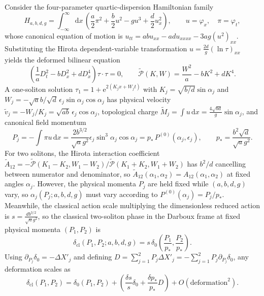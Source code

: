 \documentclass[11pt,a4paper]{article}
\newcommand{\dd}{\mathrm{d}}
\newcommand{\ee}{\mathrm{e}}
\begin{document}
Consider the four-parameter quartic-dispersion Hamiltonian family
\begin{equation}
H_{a,b,d,g} = \int_{-\infty}^\infty \dd x\,\left(\frac{a}{2}\pi^2 + \frac{b}{2}u^2 - g u^3 + \frac{d}{2}u_x^2\right), \qquad u = \varphi_x, \quad \pi = \varphi_t,
\end{equation}
whose canonical equation of motion is $u_{tt} = a b u_{xx} - a d u_{xxxx} - 3 a g (u^2)_{xx}$. Substituting the Hirota dependent-variable transformation $u = \frac{2d}{g}(\ln\tau)_{xx}$ yields the deformed bilinear equation
\begin{equation}
\left(\frac{1}{a}D_t^2 - b D_x^2 + d D_x^4\right)\tau\cdot\tau = 0, \qquad \tilde{\mathcal{P}}(K,W) = \frac{W^2}{a} - b K^2 + d K^4.
\end{equation}
A one-soliton solution $\tau_1 = 1 + \ee^{2(K_j x + W_j t)}$ with $K_j = \sqrt{b/d}\sin\alpha_j$ and $W_j = -\sqrt{a}b/\sqrt{d}\,\epsilon_j\sin\alpha_j\cos\alpha_j$ has physical velocity $\tilde{v}_j = -W_j/K_j = \sqrt{ab}\,\epsilon_j\cos\alpha_j$, topological charge $\tilde{M}_j = \int u\,\dd x = \frac{4\sqrt{bd}}{g}\sin\alpha_j$, and canonical field momentum
\begin{equation}
P_j = -\int \pi u\,\dd x = \frac{2 b^{3/2}}{\sqrt{a}g^2}\epsilon_j\sin^3\alpha_j\cos\alpha_j = p_*\,P^{(0)}(\alpha_j,\epsilon_j), \qquad p_* = \frac{b^2\sqrt{d}}{\sqrt{a}g^2}.
\end{equation}
For two solitons, the Hirota interaction coefficient $\tilde{A}_{12} = -\tilde{\mathcal{P}}(K_1-K_2,W_1-W_2)/\tilde{\mathcal{P}}(K_1+K_2,W_1+W_2)$ has $b^2/d$ cancelling between numerator and denominator, so $\tilde{A}_{12}(\alpha_1,\alpha_2) = A_{12}(\alpha_1,\alpha_2)$ at fixed angles $\alpha_j$. However, the physical momenta $P_j$ are held fixed while $(a,b,d,g)$ vary, so $\alpha_j(P_j; a,b,d,g)$ must vary according to $P^{(0)}(\alpha_j) = P_j/p_*$. Meanwhile, the classical action scale multiplying the dimensionless reduced action is $s = \frac{d b^{3/2}}{\sqrt{a}g^2}$, so the classical two-soliton phase in the Darboux frame at fixed physical momenta $(P_1,P_2)$ is
\begin{equation}
\delta_{\mathrm{cl}}(P_1,P_2; a,b,d,g) = s\,\delta_0\!\left(\frac{P_1}{p_*}, \frac{P_2}{p_*}\right).
\end{equation}
Using $\partial_{P_j}\delta_0 = -\Delta X'_j$ and defining $D = \sum_{j=1}^2 P_j \Delta X'_j = -\sum_{j=1}^2 P_j \partial_{P_j}\delta_0$, any deformation scales as
\begin{equation}
\delta_{\mathrm{cl}}(P_1,P_2) = \delta_0(P_1,P_2) + \left(\frac{\delta s}{s}\delta_0 + \frac{\delta p_*}{p_*}D\right) + O(\text{deformation}^2).
\end{equation}
\end{document}
